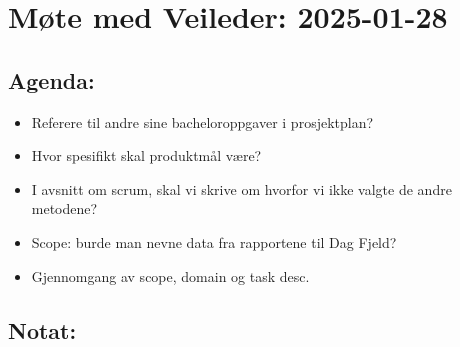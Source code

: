 \section*{Møte med Veileder: 2025-01-28}

\subsection*{Agenda:}
\begin{itemize}

\item
  Referere til andre sine bacheloroppgaver i prosjektplan?
\item
  Hvor spesifikt skal produktmål være?
\item
  I avsnitt om scrum, skal vi skrive om hvorfor vi ikke valgte de andre
  metodene?
\item
  Scope: burde man nevne data fra rapportene til Dag Fjeld?
\item
  Gjennomgang av scope, domain og task desc.
\end{itemize}

\subsection*{Notat:}


